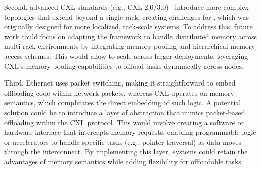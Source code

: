 Second, advanced CXL standards (e.g., CXL 2.0/3.0)~\cite{cxl} introduce more complex topologies that extend beyond a single rack, creating challenges for \pulse, which was originally designed for more localized, rack-scale systems. To address this, future work could focus on adapting the \pulse framework to handle distributed memory across multi-rack environments by integrating memory pooling and hierarchical memory access schemes. This would allow \pulse to scale across larger deployments, leveraging CXL's memory pooling capabilities to offload tasks dynamically across nodes.

Third, Ethernet uses packet switching, making it straightforward to embed offloading code within network packets, whereas CXL operates on memory semantics, which complicates the direct embedding of such logic. A potential solution could be to introduce a layer of abstraction that mimics packet-based offloading within the CXL protocol. This would involve creating a software or hardware interface that intercepts memory requests, enabling programmable logic or accelerators to handle specific tasks (e.g., pointer traversal) as data moves through the interconnect. By implementing this layer, systems could retain the advantages of memory semantics while adding flexibility for offloadable tasks.



